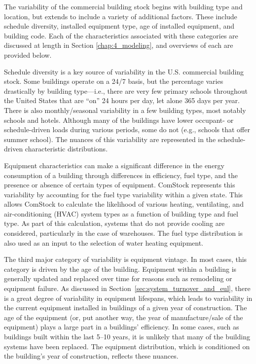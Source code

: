 The variability of the commercial building stock begins with building type and location, but extends to include a variety of additional factors. These include schedule diversity, installed equipment type, age of installed equipment, and building code. Each of the characteristics associated with these categories are discussed at length in Section \ref{chap:4_modeling}, and overviews of each are provided below.

Schedule diversity is a key source of variability in the U.S. commercial building stock. Some buildings operate on a 24/7 basis, but the percentage varies drastically by building type---i.e., there are very few primary schools throughout the United States that are ``on'' 24 hours per day, let alone 365 days per year. There is also monthly/seasonal variability in a few building types, most notably schools and hotels. Although many of the buildings have lower occupant- or schedule-driven loads during various periods, some do not (e.g., schools that offer summer school). The nuances of this variability are represented in the schedule-driven characteristic distributions.

Equipment characteristics can make a significant difference in the energy consumption of a building through differences in efficiency, fuel type, and the presence or absence of certain types of equipment. ComStock represents this variability by accounting for the fuel type variability within a given state. This allows ComStock to calculate the likelihood of various heating, ventilating, and air-conditioning (HVAC) system types as a function of building type and fuel type. As part of this calculation, systems that do not provide cooling are considered, particularly in the case of warehouses. The fuel type distribution is also used as an input to the selection of water heating equipment.

The third major category of variability is equipment vintage. In most cases, this category is driven by the age of the building. Equipment within a building is generally updated and replaced over time for reasons such as remodeling or equipment failure. As discussed in Section~\ref{sec:system_turnover_and_eul}, there is a great degree of variability in equipment lifespans, which leads to variability in the current equipment installed in buildings of a given year of construction. The age of the equipment (or, put another way, the year of manufacture/sale of the equipment) plays a large part in a buildings' efficiency. In some cases, such as buildings built within the last 5--10 years, it is unlikely that many of the building systems have been replaced. The equipment distribution, which is conditioned on the building's year of construction, reflects these nuances.

